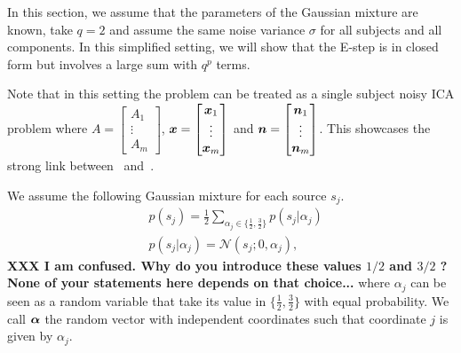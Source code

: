 In this section, we assume that the parameters of the Gaussian mixture are
known, take $q=2$ and assume the same noise variance $\sigma$ for all subjects and all
components. In this
simplified setting, we will show that the E-step is in closed form but involves
a large sum with $q^p$ terms.

Note that in this setting the problem can be treated as a single subject noisy
ICA problem where $A = \begin{bmatrix} A_1 \\ \vdots  \\ A_m \end{bmatrix}$,
$\boldsymbol{x} = \begin{bmatrix} \boldsymbol{x}_1 \\ \vdots  \\ \boldsymbol{x}_m \end{bmatrix}$ and $\boldsymbol{n}
= \begin{bmatrix} \boldsymbol{n}_1 \\ \vdots  \\ \boldsymbol{n}_m \end{bmatrix}$. This showcases the
strong link between~\cite{guo2008unified} and~\cite{moulines1997maximum}.

We assume the following Gaussian mixture for each source $s_j$.
\begin{align}
  &p(s_j) = \frac12 \sum_{\alpha_j \in \{\frac12, \frac32\}} p(s_j | \alpha_j) \\
  &p(s_j | \alpha_j) = \mathcal{N}( s_j; 0, \alpha_j),
\end{align}
\textbf{XXX I am confused. Why do you introduce these values $1/2$ and $3/2$ ? None of your statements here depends on that choice...}
where $\alpha_j$ can be seen as a random variable that take its value in $\{ \frac12,
\frac32 \}$  with equal probability. We call $\boldsymbol{\alpha}$ the random vector with
independent coordinates such that coordinate $j$ is given by $\alpha_j$.

